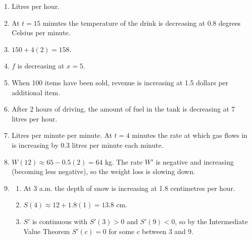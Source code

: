 \documentclass[11pt]{article}
\begin{document}
\newpage
\begin{solbox}
\begin{enumerate}[leftmargin=*,itemsep=4pt]
  \item Litres per hour.
  \item At $t=15$ minutes the temperature of the drink is decreasing at 0.8 degrees Celsius per minute.
  \item $150+4(2)=158$.
  \item $f$ is decreasing at $x=5$.
  \item When 100 items have been sold, revenue is increasing at 1.5 dollars per additional item.
  \item After 2 hours of driving, the amount of fuel in the tank is decreasing at 7 litres per hour.
  \item Litres per minute per minute. At $t=4$ minutes the rate at which gas flows in is increasing by 0.3 litres per minute each minute.
  \item $W(12)\approx65-0.5(2)=64$ kg. The rate $W'$ is negative and increasing (becoming less negative), so the weight loss is slowing down.
  \item \begin{enumerate}[label=(\alph*),leftmargin=*,itemsep=3pt]
    \item At 3 a.m. the depth of snow is increasing at 1.8 centimetres per hour.
    \item $S(4)\approx12+1.8(1)=13.8$ cm.
    \item $S'$ is continuous with $S'(3)>0$ and $S'(9)<0$, so by the Intermediate Value Theorem $S'(c)=0$ for some $c$ between 3 and 9.
  \end{enumerate}
\end{enumerate}
\end{solbox}
\end{document}

